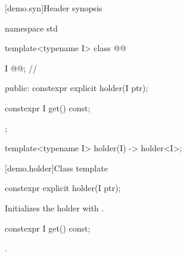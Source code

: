 [demo.syn]{Header synopsis}

\begin{codeblock}
namespace std {
  template<typename I>
  class @@ {
    I @@; // \expos

  public:
    constexpr explicit holder(I ptr);

    constexpr I get() const;
  };

  template<typename I> holder(I) -> holder<I>;
}
\end{codeblock}

[demo.holder]{Class template }

%
\begin{itemdecl}
constexpr explicit holder(I ptr);
\end{itemdecl}

\begin{itemdescr}
\pnum
\effects
Initializes the holder with .
\end{itemdescr}

%
\begin{itemdecl}
constexpr I get() const;
\end{itemdecl}

\begin{itemdescr}
\pnum
\returns
{}.
\end{itemdescr}
